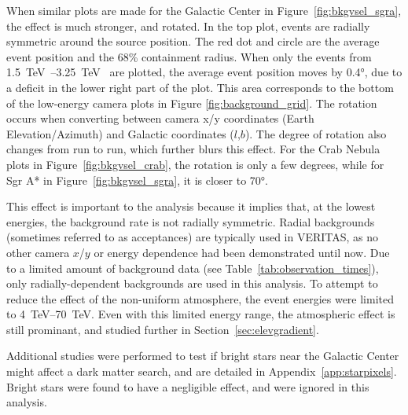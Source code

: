 When similar plots are made for the Galactic Center in Figure~\ref{fig:bkgvsel_sgra}, the effect is much stronger, and rotated.
In the top plot, events are radially symmetric around the source position.
The red dot and circle are the average event position and the 68\% containment radius.
When only the events from \SIrange{1.5}{3.25}{\TeV{}} are plotted, the average event position moves by \ang{0.4}, due to a deficit in the lower right part of the plot.
This area corresponds to the bottom of the low-energy camera plots in Figure \ref{fig:background_grid}.
The rotation occurs when converting between camera x/y coordinates (Earth Elevation/Azimuth) and Galactic coordinates ($l$,$b$).
The degree of rotation also changes from run to run, which further blurs this effect.
For the Crab Nebula plots in Figure~\ref{fig:bkgvsel_crab}, the rotation is only a few degrees, while for Sgr A* in Figure~\ref{fig:bkgvsel_sgra}, it is closer to \ang{70}.
    
This effect is important to the analysis because it implies that, at the lowest energies, the background rate is not radially symmetric.
Radial backgrounds (sometimes referred to as acceptances) are typically used in VERITAS, as no other camera $x$/$y$ or energy dependence had been demonstrated until now.
Due to a limited amount of background data (see Table~\ref{tab:observation_times}), only radially-dependent backgrounds are used in this analysis.
To attempt to reduce the effect of the non-uniform atmosphere, the event energies were limited to \SIrange{4}{70}{TeV}.
Even with this limited energy range, the atmospheric effect is still prominant, and studied further in Section~\ref{sec:elevgradient}.

Additional studies were performed to test if bright stars near the Galactic Center might affect a dark matter search, and are detailed in Appendix~\ref{app:starpixels}.
Bright stars were found to have a negligible effect, and were ignored in this analysis.

\FloatBarrier

